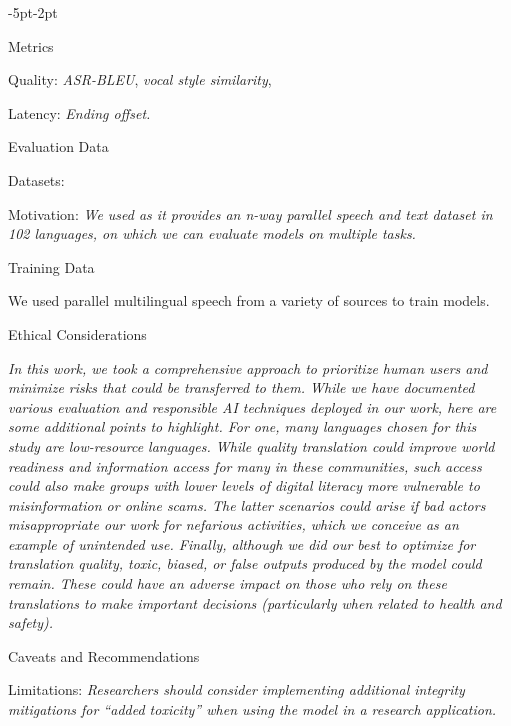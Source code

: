 \begin{adjustwidth}{-5pt}{-2pt}
\begin{singlespace}
\begin{tcolorbox}[title=\textbf{\section{Model Card - \seamless}},
    breakable, sharp corners, boxrule=0.5pt]
\begin{mcsection}{Metrics}
    \item Quality: \textit{ASR-BLEU}, \textit{vocal style similarity}, \comparator

    \item Latency: \textit{Ending offset.}
\end{mcsection}


\begin{mcsection}{Evaluation Data}
    \item Datasets: \textit{\fleurs}
\item Motivation: \textit{We used \fleurs as it provides
an n-way parallel speech and text dataset in 102 languages, on which we can evaluate \seamless models on multiple tasks.}

\end{mcsection}

\begin{mcsection}{Training Data}
\item We used parallel multilingual speech from a variety of sources to train models.
\end{mcsection}



\begin{mcsection}{Ethical Considerations}
 \item \textit{In this work, we took a comprehensive approach to prioritize human users and minimize risks that could be transferred to them. While we have documented various evaluation and responsible AI techniques deployed in our work, here are some additional points to highlight. For one, many languages chosen for this study are low-resource languages.
 While quality translation could improve world readiness and information access for many in these communities, such access could also make groups with lower levels of digital literacy more vulnerable to misinformation or online scams. The latter scenarios could arise if bad actors misappropriate our work for nefarious activities, which we conceive as an example of unintended use.
 Finally, although we did our best to optimize for translation quality, toxic, biased, or false outputs produced by the model could remain. These could have an adverse impact on those who rely on these translations to make important decisions (particularly when related to health and safety).} 
\end{mcsection}


\begin{mcsection}{Caveats and Recommendations}
  \item Limitations: \textit{Researchers should consider implementing additional integrity mitigations for ``added toxicity'' when using the model in a research application.}
\end{mcsection}


\end{tcolorbox}
\end{singlespace}
\end{adjustwidth}
